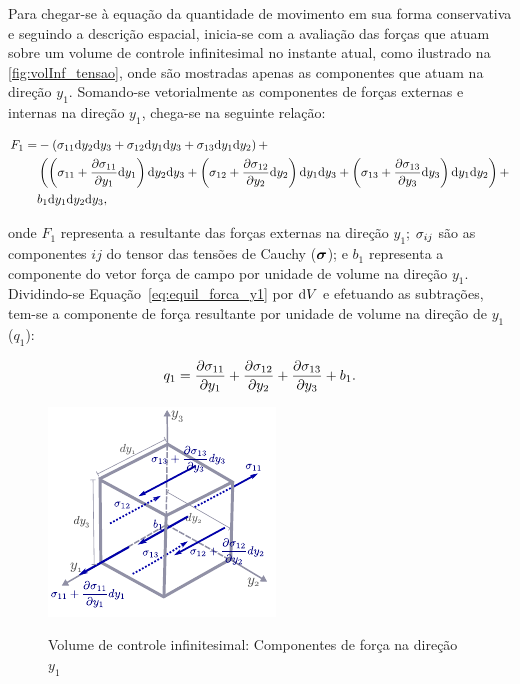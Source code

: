 Para chegar-se à equação da quantidade de movimento em sua forma conservativa e seguindo a descrição espacial, inicia-se com a avaliação das forças que atuam sobre um volume de controle infinitesimal no instante atual, como ilustrado na \autoref{fig:volInf_tensao}, onde são mostradas apenas as componentes que atuam na direção $y_1$. Somando-se vetorialmente as componentes de forças externas e internas na direção $y_1$, chega-se na seguinte relação:

\begin{align}
	\begin{split}
	F_1 =& -\left(\sigma_{11}\mathrm{d} y_2 \mathrm{d} y_3 + \sigma_{12}\mathrm{d} y_1 \mathrm{d} y_3 + \sigma_{13}\mathrm{d} y_1 \mathrm{d} y_2\right) + \\ & \left(\left(\sigma_{11} + \frac{\partial \sigma_{11}}{\partial y_1}\mathrm{d} y_1 \right)\mathrm{d} y_2 \mathrm{d} y_3 + \left(\sigma_{12}+ \frac{\partial \sigma_{12}}{\partial y_2}\mathrm{d} y_2\right)\mathrm{d} y_1 \mathrm{d} y_3 + \left(\sigma_{13}+ \frac{\partial \sigma_{13}}{\partial y_3}\mathrm{d} y_3\right)\mathrm{d} y_1 \mathrm{d} y_2\right) + \\& b_{1}\mathrm{d} y_1 \mathrm{d} y_2 \mathrm{d} y_3, \label{eq:equil_forca_y1} 
	\end{split}
\end{align}	

\noindent onde $F_1$ representa a resultante das forças externas na direção $y_1$; $\sigma_{ij}$ são as componentes $ij$ do tensor das tensões de Cauchy ($\boldsymbol{\sigma}$); e $b_1$ representa a componente do vetor força de campo por unidade de volume na direção $y_1$. Dividindo-se Equação~\eqref{eq:equil_forca_y1} por $\mathrm{d} V$ e efetuando as subtrações, tem-se a componente de força resultante por unidade de volume na direção de $y_1$ ($q_1$):

\begin{align}
		q_1 =\frac{\partial \sigma_{11}}{\partial y_1} + \frac{\partial \sigma_{12}}{\partial y_2} + \frac{\partial \sigma_{13}}{\partial y_3} + b_{1}.
\end{align}	

\begin{figure}[!htbp]
	\caption{Volume de controle infinitesimal: Componentes de força na direção $y_1$}
	\begin{center} 
	\includegraphics[scale=1.5,trim=0cm 0.0cm 0cm 0.0cm, clip=true]{Imagens/Cap2/volInf_tensao.pdf}	
	\label{fig:volInf_tensao}
	\end{center}
\end{figure}


